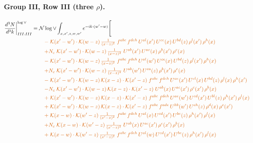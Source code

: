 \documentclass[10pt]{article}
\numberwithin{equation}{section}
\newcommand{\NNv}{\mathcal N\log\vee}
\begin{document}
\paragraph{Group III, Row III (three $\rho$).}
\begin{align}
\frac{d^3N}{d^3k}\bigg|^{\log\vee}_{III.III}={}&\NNv\int_{x,x',z,w,w'}e^{-ik\cdot(w'-w)}\Bigg[\notag\\
&\quad{\color{BFK}-\;\mathcal{K}(x'-w')\cdot\mathcal{K}(w-z)\,\tfrac{1}{(x-z)^{2}}\;f^{abc}\,f^{deh}\,U^{al}(x')\,U^{ce}(x)\,U^{bd}(z)\,\rho^{l}(x')\,\rho^{h}(x)}\notag\\
&\quad{\color{BFK}+N_c\;\mathcal{K}(x'-w')\cdot\mathcal{K}(w-z)\,\tfrac{1}{(x-z)^{2}}\;U^{ab}(x')\,U^{ac}(x)\,\rho^{b}(x')\,\rho^{c}(x)}\notag\\
&\quad{\color{BFK}-\;\mathcal{K}(x'-w')\cdot\mathcal{K}(w-z)\,\tfrac{1}{(x-z)^{2}}\;f^{abc}\,f^{deh}\,U^{al}(w')\,U^{ce}(x)\,U^{bd}(z)\,\rho^{l}(x')\,\rho^{h}(x)}\notag\\
&\quad{\color{BFK}+N_c\;\mathcal{K}(x'-w')\cdot\mathcal{K}(w-z)\,\tfrac{1}{(x-z)^{2}}\;U^{ab}(w')\,U^{ca}(z)\,\rho^{b}(x')\,\rho^{c}(x)}\notag\\
&\quad{\color{BFK}-\;\mathcal{K}(x'-w')\cdot\mathcal{K}(w-z)\,\mathcal{K}(x-z)\cdot\mathcal{K}(x'-z)\;f^{abc}\,f^{deh}\,U^{ae}(x')\,U^{cl}(x)\,U^{bd}(z)\,\rho^{l}(x)\,\rho^{h}(x')}\notag\\
&\quad{\color{BFK}-N_c\;\mathcal{K}(x'-w')\cdot\mathcal{K}(w-z)\,\mathcal{K}(x-z)\cdot\mathcal{K}(x'-z)\;U^{ab}(x)\,U^{ac}(x')\,\rho^{c}(x')\,\rho^{b}(x)}\notag\\
&\quad{\color{BFK}+\;\mathcal{K}(x'-w')\cdot\mathcal{K}(w-z)\,\mathcal{K}(x-z)\cdot\mathcal{K}(x'-z)\;f^{abc}\,f^{deh}\,U^{ae}(w')\,U^{cd}(x')\,U^{bl}(z)\,\rho^{h}(x')\,\rho^{l}(x)}\notag\\
&\quad{\color{BFK}+\;\mathcal{K}(x'-w')\cdot\mathcal{K}(w-z)\,\mathcal{K}(x-z)\cdot\mathcal{K}(x'-z)\;f^{abc}\,f^{ade}\,U^{hb}(w')\,U^{eh}(z)\,\rho^{d}(x)\,\rho^{c}(x')}\notag\\
&\quad{\color{BFK}+\;\mathcal{K}(x-w)\cdot\mathcal{K}(w'-z)\,\tfrac{1}{(x'-z)^{2}}\;f^{abc}\,f^{deh}\,U^{al}(x)\,U^{cd}(x')\,U^{be}(z)\,\rho^{h}(x')\,\rho^{l}(x)}\notag\\
&\quad{\color{BFK}+N_c\;\mathcal{K}(x-w)\cdot\mathcal{K}(w'-z)\,\tfrac{1}{(x'-z)^{2}}\;U^{ab}(x)\,U^{ac}(x')\,\rho^{c}(x')\,\rho^{b}(x)}\notag\\
&\quad{\color{BFK}+\;\mathcal{K}(x-w)\cdot\mathcal{K}(w'-z)\,\tfrac{1}{(x'-z)^{2}}\;f^{abc}\,f^{deh}\,U^{al}(w)\,U^{cd}(x')\,U^{be}(z)\,\rho^{h}(x')\,\rho^{l}(x)}\notag\\

\end{align}
\end{document}
